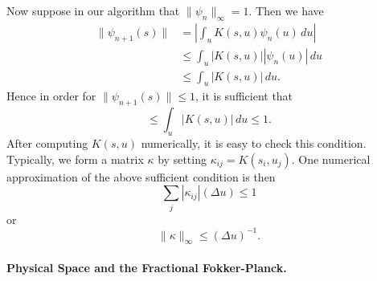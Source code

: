 \documentclass[11pt,letterpaper]{article}
\begin{document}
Now suppose in our algorithm that $\| \psi_n \|_\infty = 1$.  Then we have
\begin{align*}
\| \psi_{n+1} (s) \| &= \left| \int_u K(s,u) \psi_n(u) \, du \right| \\
 &\leq \int_u |K(s,u)| |\psi_n(u)| \, du \\
 &\leq \int_u |K(s,u)| \, du.
\end{align*}
Hence in order for $\| \psi_{n+1}(s) \| \leq 1$, it is sufficient that
\[
\leq \int_u |K(s,u)| \, du \leq 1.
\]
After computing $K(s,u)$ numerically, it is easy to check this condition.  Typically, we form a matrix $\kappa$ by setting $\kappa_{ij} = K(s_i, u_j)$.  One numerical approximation of the above sufficient condition is then
\[
\sum_{j} |\kappa_{ij}| (\Delta u) \leq 1
\]
or
\[
\| \kappa \|_\infty \leq (\Delta u)^{-1}.
\]

\paragraph{Physical Space and the Fractional Fokker-Planck.}
\end{document}
